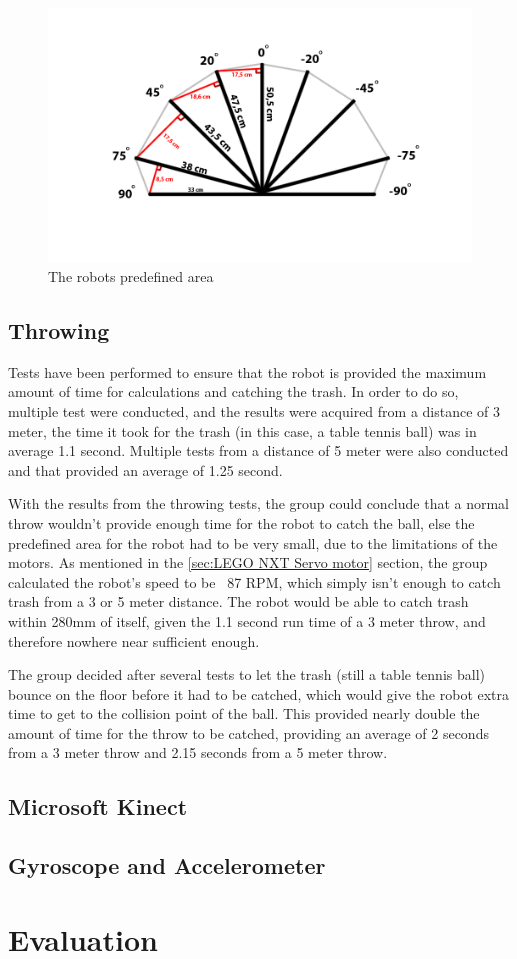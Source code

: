 \begin{figure}[h]
\centering
\includegraphics[scale=0.35]{billeder/predefined-area}
\caption{The robots predefined area}
\label{figure:Predefined area}
\end{figure}

\subsection{Throwing}
\label{sec:i1ThrowingImplementation}
Tests have been performed to ensure that the robot is provided the maximum amount of time for calculations and catching the trash. In order to do so, multiple test were conducted, and the results were acquired from a distance of 3 meter, the time it took for the trash (in this case, a table tennis ball) was in average 1.1 second. Multiple tests from a distance of 5 meter were also conducted and that provided an average of 1.25 second. 

With the results from the throwing tests, the group could conclude that a normal throw wouldn't provide enough time for the robot to catch the ball, else the predefined area for the robot had to be very small, due to the limitations of the motors. As mentioned in the \ref{sec:LEGO NXT Servo motor} section, the group calculated the robot's speed to be ~87 RPM, which simply isn't enough to catch trash from a 3 or 5 meter distance. The robot would be able to catch trash within 280mm of itself, given the 1.1 second run time of a 3 meter throw, and therefore nowhere near sufficient enough. 

The group decided after several tests to let the trash (still a table tennis ball) bounce on the floor before it had to be catched, which would give the robot extra time to get to the collision point of the ball. This provided nearly double the amount of time for the throw to be catched, providing an average of 2 seconds from a 3 meter throw and 2.15 seconds from a 5 meter throw.

\subsection{Microsoft Kinect}
\label{sec:i1Microsoft KinectImplementation}

\subsection{Gyroscope and Accelerometer}
\label{sec:i1Gyroscope and AccelerometerImplementation}

\section{Evaluation}
\label{sec:i1Evaluation}
